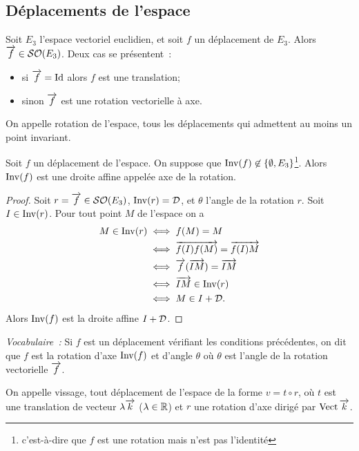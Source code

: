 \subsection{Déplacements de l'espace}

Soit \(E_3\) l'espace vectoriel euclidien, et soit \(f\) un déplacement de 
\(E_3\). Alors \(\overrightarrow{f} \in \mathcal{SO}\!\left(E_3\right)\). Deux cas se présentent~:
\begin{itemize}
  \item si \(\overrightarrow{f}=\operatorname{Id}\) alors \(f\) est une translation;
  \item sinon \(\overrightarrow{f}\) est une rotation vectorielle à axe.
\end{itemize}

\begin{defdef}
  On appelle rotation de l'espace, tous les déplacements qui admettent au moins 
  un point invariant.
\end{defdef}
\begin{prop}
  Soit \(f\) un déplacement de l'espace. On suppose que \(\operatorname{Inv}(f) \not\in 
  \{\emptyset, E_3\}\)\footnote{c'est-à-dire que \(f\) est une rotation mais 
  n'est pas l'identité}. Alors \(\operatorname{Inv}(f)\) est une droite affine appelée axe de 
  la rotation.
\end{prop}
\begin{proof}
  Soit \(r=\overrightarrow{f} \in\mathcal{SO}\!\left(E_3\right)\), \(\operatorname{Inv}(r)=\mathcal{D}\), et \(\theta\) l'angle de 
  la rotation \(r\). Soit \(I \in \operatorname{Inv}(r)\). Pour tout point \(M\) de l'espace 
  on a
  \begin{align}
    M \in \operatorname{Inv}(r) &\iff f(M)=M \\
    &\iff \overrightarrow{f(I)f(M)} = \overrightarrow{f(I)M} \\
    &\iff \overrightarrow{f}(\overrightarrow{IM}) = \overrightarrow{IM} \\
    &\iff \overrightarrow{IM} \in \operatorname{Inv}(r)\\
    &\iff M \in I+\mathcal{D}.
  \end{align}
  Alors \(\operatorname{Inv}(f)\) est la droite affine \(I+\mathcal{D}\).
\end{proof}

\emph{Vocabulaire~:} Si \(f\) est un déplacement vérifiant les conditions 
précédentes, on dit que \(f\) est la rotation d'axe \(\operatorname{Inv}(f)\) et d'angle 
\(\theta\) où \(\theta\) est l'angle de la rotation vectorielle \(\overrightarrow{f}\).

\begin{defdef}
  On appelle vissage, tout déplacement de l'espace de la forme \(v=t \circ r\), 
  où \(t\) est une translation de vecteur \(\lambda \overrightarrow{k}\) (\(\lambda \in \mathbb{R}\)) 
  et \(r\) une rotation d'axe dirigé par \(\operatorname{Vect}{\overrightarrow{k}}\).
\end{defdef}

